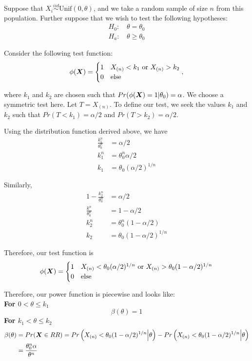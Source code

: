 \documentclass[]{article}
\newcommand{\bfX}{\mbox{\boldmath $X$}}
\begin{document}
Suppose that $X_i \stackrel{iid}{\sim} \text{Unif}(0, \theta)$, and we take a random sample of size $n$ from this population. Further suppose that we wish to test the following hypotheses:
\[
\begin{split}
\text{$H_0$: }& \theta = \theta_0 \\
\text{$H_a$: }& \theta \geq \theta_0
\end{split}
\]

Consider the following test function:
\[
\phi(\bfX) = \begin{cases}
1 & X_{(n)} < k_1 \text{ or } X_{(n)} > k_2 \\
0 & \text{else}
\end{cases},
\]

where $k_1$ and $k_2$ are chosen such that $Pr(\phi(\bfX) = 1|\theta_0) = \alpha$. We choose a symmetric test here. Let $T = X_{(n)}$. To define our test, we seek the values $k_1$ and $k_2$ such that $Pr(T < k_1) = \alpha/2$ and $Pr(T > k_2) = \alpha/2$.

Using the distribution function derived above, we have
\[
\begin{split}
\frac{k_1^n}{\theta_0^n} &= \alpha/2 \\
k_1^n &= \theta_0^n\alpha/2 \\
k_1 &= \theta_0(\alpha/2)^{1/n}
\end{split}
\]

Similarly, 
\[
\begin{split}
1 - \frac{k_2^n}{\theta_0^n} &= \alpha/2 \\
\frac{k^n}{\theta_0^n} &= 1 - \alpha/2 \\
k_2^n &= \theta_0^n(1-\alpha/2) \\
k_2 &= \theta_0(1-\alpha/2)^{1/n}
\end{split}
\]

Therefore, our test function is
\[
\phi(\bfX) = \begin{cases}
1 & X_{(n)} < \theta_0(\alpha/2)^{1/n} \text{ or } X_{(n)} >  \theta_0(1-\alpha/2)^{1/n} \\
0 & \text{else}
\end{cases}
\]

Therefore, our power function is piecewise and looks like:\\
\textbf{For $0 < \theta \leq k_1$}
\[
\beta(\theta) = 1
\]
\textbf{For $k_1 < \theta \leq k_2$}
\[
\begin{split}
\beta(\theta) &= Pr(\bfX \in RR) = Pr\left(X_{(n)} < \theta_0(1-\alpha/2)^{1/n} \Big| \theta\right) - Pr\left(X_{(n)} < \theta_0(1-\alpha/2)^{1/n} \Big| \theta\right)\\
&= \frac{\theta_0^n\alpha}{\theta^n}
\end{split}
\]
\end{document}
